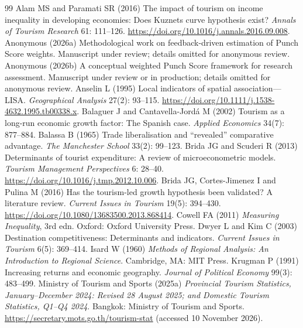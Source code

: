 \documentclass[11pt,a4paper]{article}
\begin{document}

\begin{thebibliography}{99}\small
{} Alam MS and Paramati SR (2016) The impact of tourism on income inequality in developing economies: Does Kuznets curve hypothesis exist? \emph{Annals of Tourism Research} 61: 111--126. \url{https://doi.org/10.1016/j.annals.2016.09.008}.
 Anonymous (2026a) Methodological work on feedback-driven estimation of Punch Score weights. Manuscript under review; details omitted for anonymous review.
 Anonymous (2026b) A conceptual weighted Punch Score framework for research assessment. Manuscript under review or in production; details omitted for anonymous review.
 Anselin L (1995) Local indicators of spatial association---LISA. \emph{Geographical Analysis} 27(2): 93--115. \url{https://doi.org/10.1111/j.1538-4632.1995.tb00338.x}.
 Balaguer J and Cantavella-Jord\'a M (2002) Tourism as a long-run economic growth factor: The Spanish case. \emph{Applied Economics} 34(7): 877--884.
 Balassa B (1965) Trade liberalisation and ``revealed'' comparative advantage. \emph{The Manchester School} 33(2): 99--123.
 Brida JG and Scuderi R (2013) Determinants of tourist expenditure: A review of microeconometric models. \emph{Tourism Management Perspectives} 6: 28--40. \url{https://doi.org/10.1016/j.tmp.2012.10.006}.
 Brida JG, Cortes-Jimenez I and Pulina M (2016) Has the tourism-led growth hypothesis been validated? A literature review. \emph{Current Issues in Tourism} 19(5): 394--430. \url{https://doi.org/10.1080/13683500.2013.868414}.
 Cowell FA (2011) \emph{Measuring Inequality}, 3rd edn. Oxford: Oxford University Press.
 Dwyer L and Kim C (2003) Destination competitiveness: Determinants and indicators. \emph{Current Issues in Tourism} 6(5): 369--414.
 Isard W (1960) \emph{Methods of Regional Analysis: An Introduction to Regional Science}. Cambridge, MA: MIT Press.
 Krugman P (1991) Increasing returns and economic geography. \emph{Journal of Political Economy} 99(3): 483--499.
 Ministry of Tourism and Sports (2025a) \emph{Provincial Tourism Statistics, January--December 2024: Revised 28 August 2025; and Domestic Tourism Statistics, Q1--Q4 2024}. Bangkok: Ministry of Tourism and Sports. \url{https://secretary.mots.go.th/tourism-stat} (accessed 10 November 2026).

\end{thebibliography}
\end{document}
